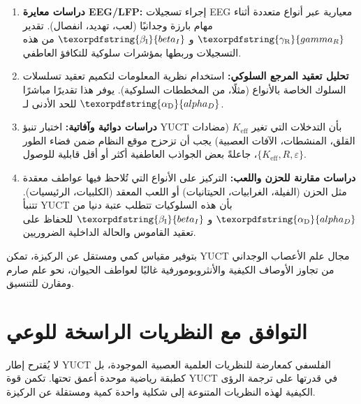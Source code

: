 \documentclass[12pt,a4paper]{article}
\DeclareRobustCommand{\alD}{\texorpdfstring{\ensuremath{\alpha_{\mathrm{D}}}}{alpha_D}}
\DeclareRobustCommand{\beI}{\texorpdfstring{\ensuremath{\beta_{\mathrm{I}}}}{beta_I}}
\DeclareRobustCommand{\gaR}{\texorpdfstring{\ensuremath{\gamma_{\mathrm{R}}}}{gamma_R}}
\begin{document}
	\begin{enumerate}
		\item \textbf{دراسات معايرة EEG/LFP:} إجراء تسجيلات EEG معيارية عبر أنواع متعددة أثناء مهام بارزة وجدانيًا (لعب، تهديد، انفصال). تقدير \(\gaR\) و \(\beI\) من هذه التسجيلات وربطها بمؤشرات سلوكية للتكافؤ العاطفي.
		\item \textbf{تحليل تعقيد المرجع السلوكي:} استخدام نظرية المعلومات لتكميم تعقيد تسلسلات السلوك الخاصة بالأنواع (مثلًا، من المخططات السلوكية). يوفر هذا تقديرًا مباشرًا للحد الأدنى لـ \(\alD\).
		\item \textbf{دراسات دوائية وآفاتية:} اختبار تنبؤ YUCT بأن التدخلات التي تغير \(K_{\mathrm{eff}}\) (مضادات القلق، المنشطات، الآفات العصبية) يجب أن تزحزح موقع النظام ضمن فضاء الطور \(\{K_{\mathrm{eff}}, R, \varepsilon\}\)، جاعلةً بعض الجواذب العاطفية أكثر أو أقل قابلية للوصول.
		\item \textbf{دراسات مقارنة للحزن واللعب:} التركيز على الأنواع التي تُلاحظ فيها عواطف معقدة مثل الحزن (الفيلة، الغرابيات، الحيتانيات) أو اللعب المعقد (الكلبيات، الرئيسيات). تتنبأ YUCT بأن هذه السلوكيات تتطلب عتبة دنيا من \(\alD\) و \(\beI\) للحفاظ على تعقيد القاموس والحالة الداخلية الضروريين.
	\end{enumerate}
	
	بتوفير مقياس كمي ومستقل عن الركيزة، تمكن YUCT مجال علم الأعصاب الوجداني من تجاوز الأوصاف الكيفية والأنثروبومورفية غالبًا لعواطف الحيوان، نحو علم صارم ومقارن للتنسيق.
	
	\section{التوافق مع النظريات الراسخة للوعي}
	
	لا يُقترح إطار YUCT الفلسفي كمعارضة للنظريات العلمية العصبية الموجودة، بل كطبقة رياضية موحدة أعمق تحتها. تكمن قوة YUCT في قدرتها على ترجمة الرؤى الكيفية لهذه النظريات المتنوعة إلى شكلية واحدة كمية ومستقلة عن الركيزة.
	
\end{document}
